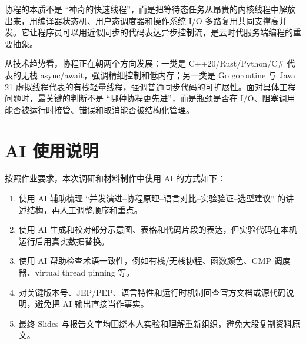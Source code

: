 \documentclass[UTF8,a4paper,12pt]{ctexart}
\begin{document}
协程的本质不是 ``神奇的快速线程''，而是把等待态任务从昂贵的内核线程中解放出来，用编译器状态机、用户态调度器和操作系统 I/O 多路复用共同支撑高并发。它让程序员可以用近似同步的代码表达异步控制流，是云时代服务端编程的重要抽象。

从技术趋势看，协程正在朝两个方向发展：一类是 C++20/Rust/Python/C\# 代表的无栈 async/await，强调精细控制和低内存；另一类是 Go goroutine 与 Java 21 虚拟线程代表的有栈轻量线程，强调普通同步代码的可扩展性。面对具体工程问题时，最关键的判断不是 ``哪种协程更先进''，而是瓶颈是否在 I/O、阻塞调用能否被运行时接管、错误和取消能否被结构化管理。

\section{AI 使用说明}

按照作业要求，本次调研和材料制作中使用 AI 的方式如下：

\begin{enumerate}
  \item 使用 AI 辅助梳理 ``并发演进--协程原理--语言对比--实验验证--选型建议'' 的讲述结构，再人工调整顺序和重点。
  \item 使用 AI 生成和校对部分示意图、表格和代码片段的表达，但实验代码在本机运行后用真实数据替换。
  \item 使用 AI 帮助检查术语一致性，例如有栈/无栈协程、函数颜色、GMP 调度器、virtual thread pinning 等。
  \item 对关键版本号、JEP/PEP、语言特性和运行时机制回查官方文档或源代码说明，避免把 AI 输出直接当作事实。
  \item 最终 Slides 与报告文字均围绕本人实验和理解重新组织，避免大段复制资料原文。
\end{enumerate}

\newpage


\end{document}
